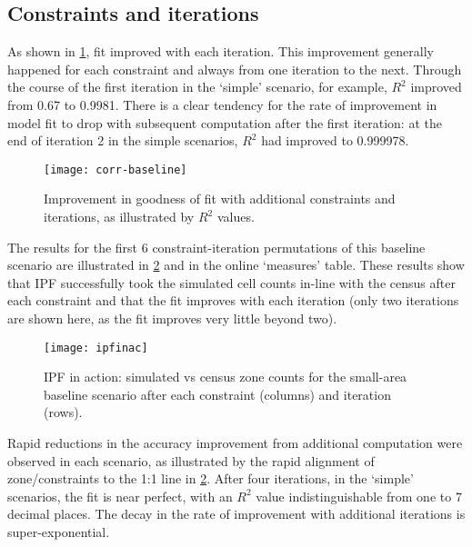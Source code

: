 \documentclass[a4paper,10pt]{article}
\begin{document}
\subsection{Constraints and iterations}
As shown in \cref{fnconscor}, fit
improved with each iteration.
This improvement generally happened for each constraint
and always from one iteration to the next.
Through the course of the first
iteration in the `simple' scenario, for example, $R^2$ improved
from 0.67 to 0.9981. There is a clear tendency for the rate of improvement
in model fit to drop with subsequent computation after the first iteration:
at the end of iteration 2 in the simple scenarios, $R^2$ had improved to 0.999978.

\begin{figure}[h]
 \begin{center}
  \texttt{[image: corr-baseline]}
 \end{center}
\caption{Improvement in goodness of fit with additional constraints and iterations,
as illustrated by $R^2$ values.}
\label{fnconscor}
\end{figure}

The results for the first 6 constraint-iteration permutations
of this baseline scenario are illustrated in \cref{fipfinac} and %
in the online `measures' table. These results show that IPF successfully
took the simulated cell counts in-line with the census after each constraint
and that the fit improves with each iteration (only two iterations are
shown here, as the fit improves very little beyond two).

\begin{figure}
 \begin{center}
  \texttt{[image: ipfinac]}
 \end{center}
\caption{IPF in action: simulated vs census zone counts for the small-area baseline scenario after each constraint (columns) and iteration (rows).}
\label{fipfinac}
\end{figure}

Rapid reductions in the accuracy improvement from
additional computation were observed in each scenario, as illustrated
by the rapid alignment of zone/constraints to the 1:1 line in \cref{fipfinac}.
After four iterations, in the `simple' scenarios,
the fit is near perfect, with an $R^2$ value indistinguishable from one
to 7 decimal places. The decay in the rate of improvement with additional
iterations is super-exponential.
\end{document}
